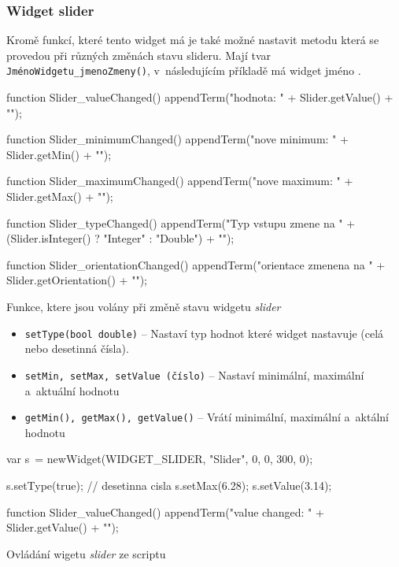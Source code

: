 \documentclass[12pt, a4paper, oneside]{article}
\newcommand{\It}{\textit}  %
\begin{document}
\subsubsection*{Widget slider}
Kromě funkcí, které tento widget má je také možné nastavit metodu která se provedou při různých změnách stavu slideru. Mají tvar  {\color{blue}\verb/JménoWidgetu_jmenoZmeny()/}, v~následujícím příkladě má widget jméno .
\begin{listing}[H]
\begin{jscode}
function Slider_valueChanged() {
    appendTerm("hodnota: " + Slider.getValue() + "\n");
}

function Slider_minimumChanged() {
    appendTerm("nove minimum: " + Slider.getMin() + "\n");
}

function Slider_maximumChanged() {
    appendTerm("nove maximum: " + Slider.getMax() + "\n");
}

function Slider_typeChanged() {
    appendTerm("Typ vstupu zmene na " +
        (Slider.isInteger() ? "Integer" : "Double") + "\n");
}

function Slider_orientationChanged() {
    appendTerm("orientace zmenena na " +
        Slider.getOrientation() + "\n");
}
\end{jscode}
\caption{Funkce, ktere jsou volány při změně stavu widgetu \It{slider}}
\end{listing}
\begin{itemize}
    \item {\color{blue}\verb/setType(bool double)/} -- Nastaví typ hodnot které widget nastavuje (celá nebo desetinná čísla).
    \item {\color{blue}\verb/setMin, setMax, setValue (číslo)/} -- Nastaví minimální, maximální a~aktuální hodnotu
    \item {\color{blue}\verb/getMin(), getMax(), getValue()/} -- Vrátí minimální, maximální a~aktální hodnotu
\end{itemize}

\begin{listing}[H]
\begin{jscode}
var s~= newWidget(WIDGET_SLIDER, "Slider", 0, 0, 300, 0);

s.setType(true); // desetinna cisla
s.setMax(6.28);
s.setValue(3.14);

function Slider_valueChanged() {
    appendTerm("value changed: " + Slider.getValue() + "\n");
}
\end{jscode}
\caption{Ovládání wigetu \It{slider} ze scriptu}
\end{listing}
\end{document}
